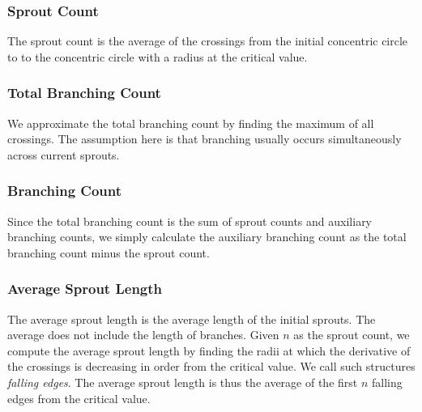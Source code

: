\documentclass{sig-alternate}
\begin{document}
		\subsubsection{Sprout Count} %
		\label{ssub:Sprout Counts}
			The sprout count is the average of the crossings from the initial
			concentric circle to to the concentric circle with a radius at
			the critical value.

		\subsubsection{Total Branching Count} %
		\label{ssub:Total Branching Count}
			We approximate the total branching count by finding the maximum of
			all crossings. The assumption here is that branching usually occurs
			simultaneously across current sprouts.

		\subsubsection{Branching Count}
		\label{ssub:Branching Counts}
			Since the total branching count is the sum of sprout counts and
			auxiliary branching counts, we simply calculate the auxiliary
			branching count as the total branching count minus the sprout
			count.

		\subsubsection{Average Sprout Length} %
		\label{ssub:Average Sprout Length}
			The average sprout length is the average length of the initial
			sprouts. The average does not include the length of branches.
			Given $n$ as the sprout count, we compute the average sprout length
			by finding the radii at which the derivative of the crossings is
			decreasing in order from the critical value. We call such structures
			\emph{falling edges}. The average sprout length is thus the average
			of the first $n$ falling edges from the critical value.
\end{document}
